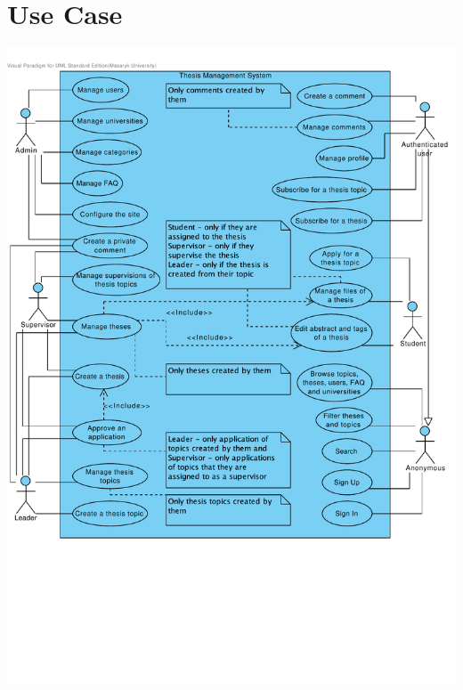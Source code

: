\documentclass[11pt,oneside]{fithesis2}
\begin{document}
\section{Use Case}
\includegraphics[keepaspectratio, trim=0 100 10 30, clip, width=\textwidth]{./images/use-case.pdf}
\end{document}
